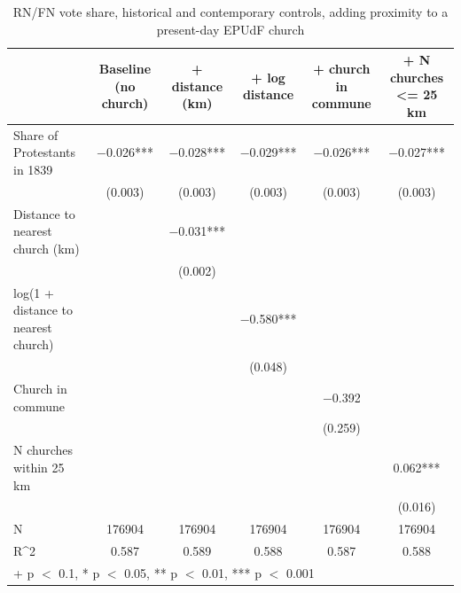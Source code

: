 \begin{table}
\centering
\caption{RN/FN vote share, historical and contemporary controls, adding proximity to a present-day EPUdF church}
\centering
\begin{tabular}[t]{lccccc}
\toprule
  & Baseline (no church) & + distance (km) & + log distance & + church in commune & + N churches <= 25 km\\
\midrule
Share of Protestants in 1839 & \num{-0.026}*** & \num{-0.028}*** & \num{-0.029}*** & \num{-0.026}*** & \num{-0.027}***\\
 & (\num{0.003}) & (\num{0.003}) & (\num{0.003}) & (\num{0.003}) & (\num{0.003})\\
Distance to nearest church (km) &  & \num{-0.031}*** &  &  & \\
 &  & (\num{0.002}) &  &  & \\
log(1 + distance to nearest church) &  &  & \num{-0.580}*** &  & \\
 &  &  & (\num{0.048}) &  & \\
Church in commune &  &  &  & \num{-0.392} & \\
 &  &  &  & (\num{0.259}) & \\
N churches within 25 km &  &  &  &  & \num{0.062}***\\
 &  &  &  &  & (\num{0.016})\\
\midrule
N & \num{176904} & \num{176904} & \num{176904} & \num{176904} & \num{176904}\\
R\textasciicircum{}2 & \num{0.587} & \num{0.589} & \num{0.588} & \num{0.587} & \num{0.588}\\
\bottomrule
\multicolumn{6}{l}{\rule{0pt}{1em}+ p $<$ 0.1, * p $<$ 0.05, ** p $<$ 0.01, *** p $<$ 0.001}\\
\end{tabular}
\end{table}

